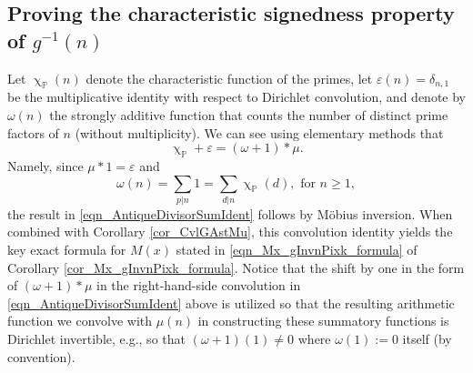 \documentclass[11pt,reqno,a4letter]{article}
\numberwithin{figure}{section}
\numberwithin{table}{section}
\renewcommand{\chi}{\upchi}
\theoremstyle{plain}
\numberwithin{theorem}{section}
\theoremstyle{definition}
\begin{document}
\subsection{Proving the characteristic signedness property of $g^{-1}(n)$} 

Let $\chi_{\mathbb{P}}(n)$ denote the characteristic function of the primes, let 
$\varepsilon(n) = \delta_{n,1}$ be the multiplicative identity with respect to Dirichlet convolution, 
and denote by $\omega(n)$ the strongly additive function that counts the number of 
distinct prime factors of $n$ (without multiplicity). We can see using 
elementary methods that 
\begin{equation}
\label{eqn_AntiqueDivisorSumIdent} 
\chi_{\mathbb{P}} + \varepsilon = (\omega + 1) \ast \mu. 
\end{equation} 
Namely, since $\mu \ast 1 = \varepsilon$ and 
\[
\omega(n) = \sum_{p|n} 1 = \sum_{d|n} \chi_{\mathbb{P}}(d), \text{ for } n \geq 1, 
\]
the result in \eqref{eqn_AntiqueDivisorSumIdent} follows by M\"obius inversion. 
When combined with Corollary \ref{cor_CvlGAstMu}, 
this convolution identity yields the key exact 
formula for $M(x)$ stated in \eqref{eqn_Mx_gInvnPixk_formula} of 
Corollary \ref{cor_Mx_gInvnPixk_formula}. 
Notice that the shift by one in the form of $(\omega + 1) \ast \mu$ in the right-hand-side 
convolution in \eqref{eqn_AntiqueDivisorSumIdent} above is 
utilized so that the resulting arithmetic function we convolve with $\mu(n)$ in constructing these 
summatory functions is Dirichlet invertible, e.g., so that $(\omega + 1)(1) \neq 0$ where 
$\omega(1) := 0$ itself (by convention). 
\end{document}
